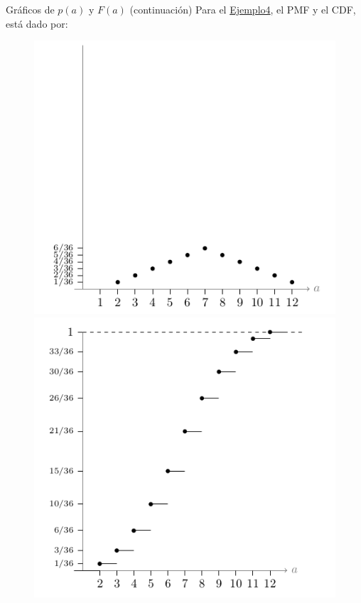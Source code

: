 \documentclass[10pt]{beamer}
\begin{document}
\begin{frame}{Gr\'aficos de $p(a)$ y $F(a)$ (continuaci\'on)}
\small {Para el \underline{Ejemplo4}, el PMF y el CDF, est\'a dado por:}
\begin{figure}
	\centering
	\begin{minipage}{.5\textwidth}
		\centering
		\includegraphics[width=0.7\linewidth]{v6}
	\end{minipage}%
	\begin{minipage}{.5\textwidth}
		\centering
		\includegraphics[width=0.7\linewidth]{v7}
	\end{minipage}
\end{figure}
\end{frame}
\end{document}
